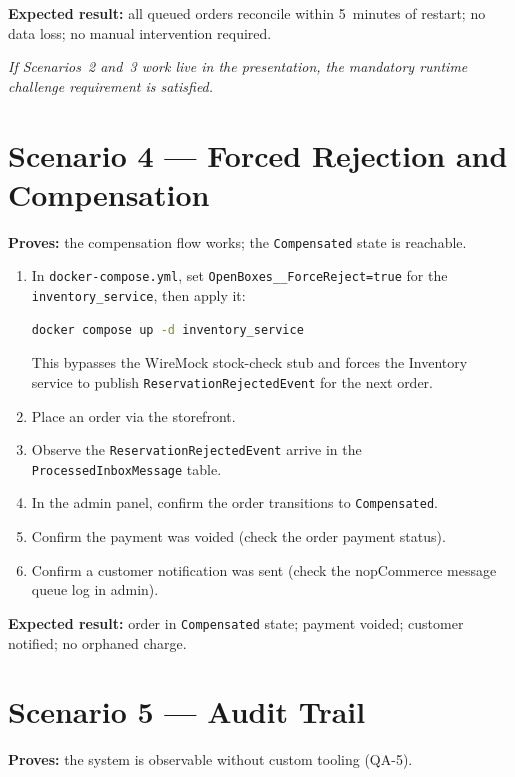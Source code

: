\textbf{Expected result:} all queued orders reconcile within 5~minutes of restart; no data loss; no manual intervention required.

\textit{If Scenarios~2 and~3 work live in the presentation, the mandatory runtime challenge requirement is satisfied.}

\section{Scenario 4 — Forced Rejection and Compensation}
\label{sec:demo-rejection}

\textbf{Proves:} the compensation flow works; the \texttt{Compensated} state is reachable.

\begin{enumerate}
    \item In \texttt{docker-compose.yml}, set \texttt{OpenBoxes\_\_ForceReject=true} for the \texttt{inventory\_service}, then apply it:
    \begin{lstlisting}[language=bash]
docker compose up -d inventory_service
    \end{lstlisting}
    This bypasses the WireMock stock-check stub and forces the Inventory service to publish \texttt{ReservationRejectedEvent} for the next order.
    \item Place an order via the storefront.
    \item Observe the \texttt{ReservationRejectedEvent} arrive in the \texttt{ProcessedInboxMessage} table.
    \item In the admin panel, confirm the order transitions to \texttt{Compensated}.
    \item Confirm the payment was voided (check the order payment status).
    \item Confirm a customer notification was sent (check the nopCommerce message queue log in admin).
\end{enumerate}

\textbf{Expected result:} order in \texttt{Compensated} state; payment voided; customer notified; no orphaned charge.

\section{Scenario 5 — Audit Trail}
\label{sec:demo-audit}

\textbf{Proves:} the system is observable without custom tooling (QA-5).

